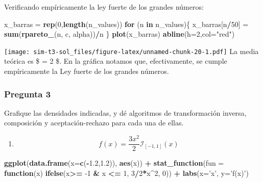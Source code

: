 \documentclass[]{article}
\newenvironment{Shaded}{\begin{snugshade}}{\end{snugshade}}
\newcommand{\ControlFlowTok}[1]{\textcolor[rgb]{0.13,0.29,0.53}{\textbf{#1}}}
\newcommand{\DataTypeTok}[1]{\textcolor[rgb]{0.13,0.29,0.53}{#1}}
\newcommand{\DecValTok}[1]{\textcolor[rgb]{0.00,0.00,0.81}{#1}}
\newcommand{\FloatTok}[1]{\textcolor[rgb]{0.00,0.00,0.81}{#1}}
\newcommand{\KeywordTok}[1]{\textcolor[rgb]{0.13,0.29,0.53}{\textbf{#1}}}
\newcommand{\NormalTok}[1]{#1}
\newcommand{\OperatorTok}[1]{\textcolor[rgb]{0.81,0.36,0.00}{\textbf{#1}}}
\newcommand{\StringTok}[1]{\textcolor[rgb]{0.31,0.60,0.02}{#1}}
\providecommand{\tightlist}{%
  \setlength{\itemsep}{0pt}\setlength{\parskip}{0pt}}
\begin{document}
Verificando empíricamente la ley fuerte de los grandes números:

\begin{Shaded}
\begin{Highlighting}[]
\NormalTok{x_barras =}\StringTok{ }\KeywordTok{rep}\NormalTok{(}\DecValTok{0}\NormalTok{,}\KeywordTok{length}\NormalTok{(n_values))}
\ControlFlowTok{for}\NormalTok{ (n }\ControlFlowTok{in}\NormalTok{ n_values)\{}
\NormalTok{  x_barras[n}\OperatorTok{/}\DecValTok{50}\NormalTok{] =}\StringTok{ }\KeywordTok{sum}\NormalTok{(}\KeywordTok{rpareto_}\NormalTok{(n, c, alpha))}\OperatorTok{/}\NormalTok{n}
\NormalTok{\}}
\KeywordTok{plot}\NormalTok{(x_barras)}
\KeywordTok{abline}\NormalTok{(}\DataTypeTok{h=}\DecValTok{2}\NormalTok{,}\DataTypeTok{col=}\StringTok{"red"}\NormalTok{)}
\end{Highlighting}
\end{Shaded}

\texttt{[image: sim-t3-sol\_files/figure-latex/unnamed-chunk-20-1.pdf]}
La media teórica es \$ = 2 \$. En la gráfica
notamos que, efectivamente, se cumple empíricamente la Ley fuerte de los
grandes números.

\hypertarget{pregunta-3-1}{%
\subsubsection{Pregunta 3}\label{pregunta-3-1}}

Grafique las densidades indicadas, y dé algoritmos de transformación
inversa, composición y aceptación-rechazo para cada una de ellas.

\begin{enumerate}
\def\labelenumi{\alph{enumi}.}
\tightlist
\item
  \[
  f(x) = \frac{3x^2}{2} \mathcal{I}_{[-1,1]}(x)
  \]
\end{enumerate}

\begin{Shaded}
\begin{Highlighting}[]
\KeywordTok{ggplot}\NormalTok{(}\KeywordTok{data.frame}\NormalTok{(}\DataTypeTok{x=}\KeywordTok{c}\NormalTok{(}\OperatorTok{-}\FloatTok{1.2}\NormalTok{,}\FloatTok{1.2}\NormalTok{)), }\KeywordTok{aes}\NormalTok{(x)) }\OperatorTok{+}
\StringTok{  }\KeywordTok{stat_function}\NormalTok{(}\DataTypeTok{fun =} \ControlFlowTok{function}\NormalTok{(x) }\KeywordTok{ifelse}\NormalTok{(x}\OperatorTok{>=}\StringTok{ }\DecValTok{-1} \OperatorTok{&}\StringTok{ }\NormalTok{x }\OperatorTok{<=}\StringTok{ }\DecValTok{1}\NormalTok{, }\DecValTok{3}\OperatorTok{/}\DecValTok{2}\OperatorTok{*}\NormalTok{x}\OperatorTok{^}\DecValTok{2}\NormalTok{, }\DecValTok{0}\NormalTok{)) }\OperatorTok{+}
\StringTok{  }\KeywordTok{labs}\NormalTok{(}\DataTypeTok{x=}\StringTok{'x'}\NormalTok{, }\DataTypeTok{y=}\StringTok{'f(x)'}\NormalTok{)}
\end{Highlighting}
\end{Shaded}
\end{document}
